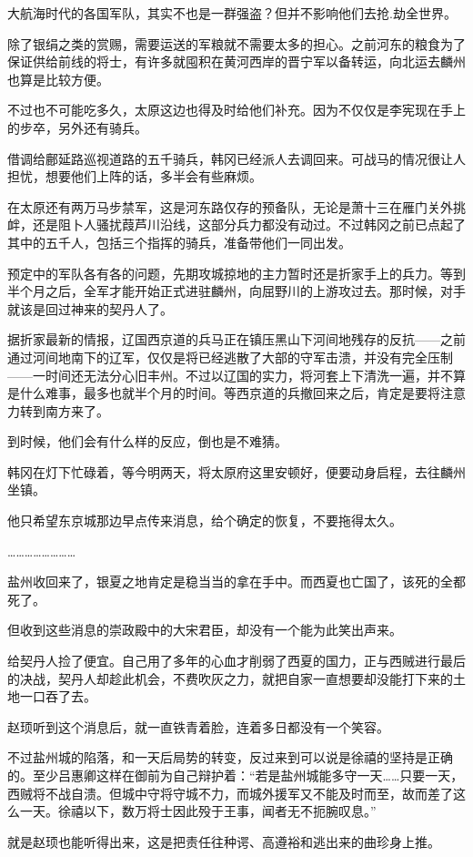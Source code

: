 大航海时代的各国军队，其实不也是一群强盗？但并不影响他们去抢.劫全世界。

除了银绢之类的赏赐，需要运送的军粮就不需要太多的担心。之前河东的粮食为了保证供给前线的将士，有许多就囤积在黄河西岸的晋宁军以备转运，向北运去麟州也算是比较方便。

不过也不可能吃多久，太原这边也得及时给他们补充。因为不仅仅是李宪现在手上的步卒，另外还有骑兵。

借调给鄜延路巡视道路的五千骑兵，韩冈已经派人去调回来。可战马的情况很让人担忧，想要他们上阵的话，多半会有些麻烦。

在太原还有两万马步禁军，这是河东路仅存的预备队，无论是萧十三在雁门关外挑衅，还是阻卜人骚扰葭芦川沿线，这部分兵力都没有动过。不过韩冈之前已点起了其中的五千人，包括三个指挥的骑兵，准备带他们一同出发。

预定中的军队各有各的问题，先期攻城掠地的主力暂时还是折家手上的兵力。等到半个月之后，全军才能开始正式进驻麟州，向屈野川的上游攻过去。那时候，对手就该是回过神来的契丹人了。

据折家最新的情报，辽国西京道的兵马正在镇压黑山下河间地残存的反抗——之前通过河间地南下的辽军，仅仅是将已经逃散了大部的守军击溃，并没有完全压制——一时间还无法分心旧丰州。不过以辽国的实力，将河套上下清洗一遍，并不算是什么难事，最多也就半个月的时间。等西京道的兵撤回来之后，肯定是要将注意力转到南方来了。

到时候，他们会有什么样的反应，倒也是不难猜。

韩冈在灯下忙碌着，等今明两天，将太原府这里安顿好，便要动身启程，去往麟州坐镇。

他只希望东京城那边早点传来消息，给个确定的恢复，不要拖得太久。

……………………

盐州收回来了，银夏之地肯定是稳当当的拿在手中。而西夏也亡国了，该死的全都死了。

但收到这些消息的崇政殿中的大宋君臣，却没有一个能为此笑出声来。

给契丹人捡了便宜。自己用了多年的心血才削弱了西夏的国力，正与西贼进行最后的决战，契丹人却趁此机会，不费吹灰之力，就把自家一直想要却没能打下来的土地一口吞了去。

赵顼听到这个消息后，就一直铁青着脸，连着多日都没有一个笑容。

不过盐州城的陷落，和一天后局势的转变，反过来到可以说是徐禧的坚持是正确的。至少吕惠卿这样在御前为自己辩护着：“若是盐州城能多守一天……只要一天，西贼将不战自溃。但城中守将守城不力，而城外援军又不能及时而至，故而差了这么一天。徐禧以下，数万将士因此殁于王事，闻者无不扼腕叹息。”

就是赵顼也能听得出来，这是把责任往种谔、高遵裕和逃出来的曲珍身上推。


